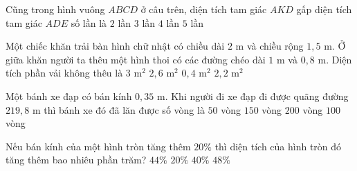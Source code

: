 \begin{ex} %
Cũng trong hình vuông $ABCD$ ở câu trên, diện tích tam giác $AKD$ gấp diện tích tam giác $ADE$ số lần là
\choice
{$2$ lần}
{$3$ lần}
{\True $4$ lần}
{$5$ lần}
\end{ex}

\begin{ex} %
Một chiếc khăn trải bàn hình chữ nhật có chiều dài $2\text{ m}$ và chiều rộng $1{,}5\text{ m}$. Ở giữa khăn người ta thêu một hình thoi có các đường chéo dài $1\text{ m}$ và $0{,}8\text{ m}$. Diện tích phần vải không thêu là
\choice
{$3\text{ m}^2$}
{\True $2{,}6\text{ m}^2$}
{$0{,}4\text{ m}^2$}
{$2{,}2\text{ m}^2$}
\end{ex}

\begin{ex} %
Một bánh xe đạp có bán kính $0{,}35\text{ m}$. Khi người đi xe đạp đi được quãng đường $219{,}8\text{ m}$ thì bánh xe đó đã lăn được số vòng là
\choice
{$50$ vòng}
{$150$ vòng}
{$200$ vòng}
{\True $100$ vòng}
\end{ex}

\begin{ex} %
Nếu bán kính của một hình tròn tăng thêm $20\%$ thì diện tích của hình tròn đó tăng thêm bao nhiêu phần trăm?
\choice
{\True $44\%$}
{$20\%$}
{$40\%$}
{$48\%$}
\end{ex}

